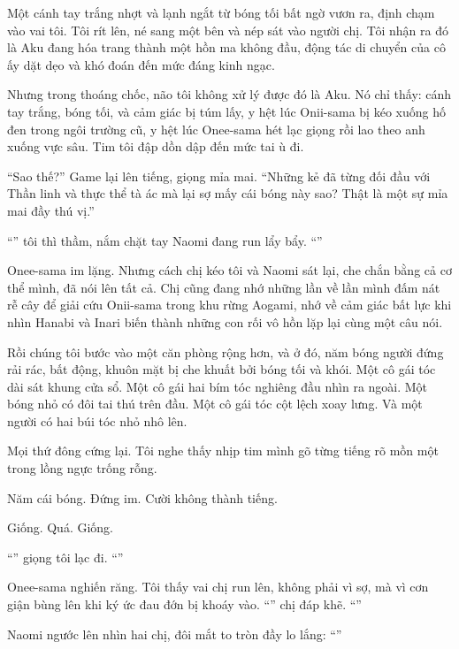 \documentclass[../main.tex]{subfiles}
\begin{document}
Một cánh tay trắng nhợt và lạnh ngắt từ bóng tối bất ngờ vươn ra, định chạm vào vai tôi. Tôi rít lên, né sang một bên và nép sát vào người chị. Tôi nhận ra đó là Aku đang hóa trang thành một hồn ma không đầu, động tác di chuyển của cô ấy dặt dẹo và khó đoán đến mức đáng kinh ngạc.

Nhưng trong thoáng chốc, não tôi không xử lý được đó là Aku. Nó chỉ thấy: cánh tay trắng, bóng tối, và cảm giác bị túm lấy, y hệt lúc Onii-sama bị kéo xuống hố đen trong ngôi trường cũ, y hệt lúc Onee-sama hét lạc giọng rồi lao theo anh xuống vực sâu. Tim tôi đập dồn dập đến mức tai ù đi.

``Sao thế?'' Game lại lên tiếng, giọng mỉa mai. ``Những kẻ đã từng đối đầu với Thần linh và thực thể tà ác mà lại sợ mấy cái bóng này sao? Thật là một sự mỉa mai đầy thú vị.''

``'' tôi thì thầm, nắm chặt tay Naomi đang run lẩy bẩy. ``''

Onee-sama im lặng. Nhưng cách chị kéo tôi và Naomi sát lại, che chắn bằng cả cơ thể mình, đã nói lên tất cả. Chị cũng đang nhớ những lần về lần mình đấm nát rễ cây để giải cứu Onii-sama trong khu rừng Aogami, nhớ về cảm giác bất lực khi nhìn Hanabi và Inari biến thành những con rối vô hồn lặp lại cùng một câu nói.

Rồi chúng tôi bước vào một căn phòng rộng hơn, và ở đó, năm bóng người đứng rải rác, bất động, khuôn mặt bị che khuất bởi bóng tối và khói. Một cô gái tóc dài sát khung cửa sổ. Một cô gái hai bím tóc nghiêng đầu nhìn ra ngoài. Một bóng nhỏ có đôi tai thú trên đầu. Một cô gái tóc cột lệch xoay lưng. Và một người có hai búi tóc nhỏ nhô lên.

Mọi thứ đông cứng lại. Tôi nghe thấy nhịp tim mình gõ từng tiếng rõ mồn một trong lồng ngực trống rỗng.

Năm cái bóng. Đứng im. Cười không thành tiếng.

Giống. Quá. Giống.

``'' giọng tôi lạc đi. ``''

Onee-sama nghiến răng. Tôi thấy vai chị run lên, không phải vì sợ, mà vì cơn giận bùng lên khi ký ức đau đớn bị khoáy vào. ``'' chị đáp khẽ. ``''

Naomi ngước lên nhìn hai chị, đôi mắt to tròn đầy lo lắng: ``''
\end{document}
